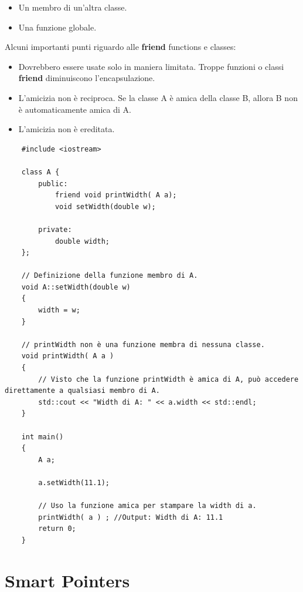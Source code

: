 \begin{itemize}
	\item \textsf{\small Un membro di un'altra classe.}
	\item \textsf{\small Una funzione globale.}
\end{itemize}

\textsf{\small Alcuni importanti punti riguardo alle \textbf{friend} functions e classes: } \\

\begin{itemize}
	\item \textsf{\small Dovrebbero essere usate solo in maniera limitata. Troppe funzioni o classi \textbf{friend} diminuiscono l'encapsulazione.}
	\item \textsf{\small L'amicizia non è reciproca. Se la classe A è amica della classe B, allora B non è automaticamente amica di A.}
	\item \textsf{\small L'amicizia non è ereditata.}
\end{itemize}

\begin{lstlisting}
	#include <iostream>
	
	class A {
		public:
			friend void printWidth( A a);
			void setWidth(double w);
			
		private:
			double width;
	};

	// Definizione della funzione membro di A.
	void A::setWidth(double w)
	{
		width = w;
	}

	// printWidth non è una funzione membra di nessuna classe.
	void printWidth( A a )
	{
		// Visto che la funzione printWidth è amica di A, può accedere direttamente a qualsiasi membro di A.
		std::cout << "Width di A: " << a.width << std::endl;
	}

	int main()
	{
		A a;
		
		a.setWidth(11.1);
		
		// Uso la funzione amica per stampare la width di a.
		printWidth( a ) ; //Output: Width di A: 11.1
		return 0;
	}
\end{lstlisting}


\newpage

\section{Smart Pointers}

